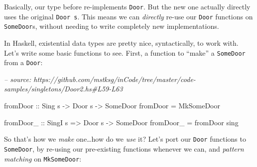 \documentclass[]{article}
\newenvironment{Shaded}{}{}
\newcommand{\CommentTok}[1]{\textcolor[rgb]{0.38,0.63,0.69}{\textit{#1}}}
\newcommand{\DataTypeTok}[1]{\textcolor[rgb]{0.56,0.13,0.00}{#1}}
\newcommand{\FunctionTok}[1]{\textcolor[rgb]{0.02,0.16,0.49}{#1}}
\newcommand{\KeywordTok}[1]{\textcolor[rgb]{0.00,0.44,0.13}{\textbf{#1}}}
\newcommand{\NormalTok}[1]{#1}
\newcommand{\OtherTok}[1]{\textcolor[rgb]{0.00,0.44,0.13}{#1}}
\begin{document}
Basically, our type before re-implements \texttt{Door}. But the new one actually
directly uses the original \texttt{Door\ s}. This means we can \emph{directly}
re-use our \texttt{Door} functions on \texttt{SomeDoor}s, without needing to
write completely new implementations.

In Haskell, existential data types are pretty nice, syntactically, to work with.
Let's write some basic functions to see. First, a function to ``make'' a
\texttt{SomeDoor} from a \texttt{Door}:

\begin{Shaded}
\begin{Highlighting}[]
\CommentTok{-- source: https://github.com/mstksg/inCode/tree/master/code-samples/singletons/Door2.hs#L59-L63}

\OtherTok{fromDoor ::} \DataTypeTok{Sing}\NormalTok{ s }\OtherTok{->} \DataTypeTok{Door}\NormalTok{ s }\OtherTok{->} \DataTypeTok{SomeDoor}
\NormalTok{fromDoor }\FunctionTok{=} \DataTypeTok{MkSomeDoor}

\OtherTok{fromDoor_ ::} \DataTypeTok{SingI}\NormalTok{ s }\OtherTok{=>} \DataTypeTok{Door}\NormalTok{ s }\OtherTok{->} \DataTypeTok{SomeDoor}
\NormalTok{fromDoor_ }\FunctionTok{=}\NormalTok{ fromDoor sing}
\end{Highlighting}
\end{Shaded}

So that's how we \emph{make} one\ldots{}how do we \emph{use} it? Let's port our
\texttt{Door} functions to \texttt{SomeDoor}, by re-using our pre-existing
functions whenever we can, and \emph{pattern matching} on \texttt{MkSomeDoor}:

\begin{Shaded}
\end{Shaded}
\end{document}
